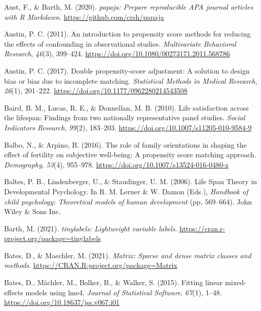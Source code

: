 \documentclass[
  english,
  man,floatsintext]{apa7}
\begin{document}
\leavevmode\hypertarget{ref-R-papaja}{}%
Aust, F., \& Barth, M. (2020). \emph{papaja: Prepare reproducible APA journal articles with R Markdown}. \url{https://github.com/crsh/papaja}

\leavevmode\hypertarget{ref-austinIntroductionPropensityScore2011}{}%
Austin, P. C. (2011). An introduction to propensity score methods for reducing the effects of confounding in observational studies. \emph{Multivariate Behavioral Research}, \emph{46}(3), 399--424. \url{https://doi.org/10.1080/00273171.2011.568786}

\leavevmode\hypertarget{ref-austinDoublePropensityscoreAdjustment2017}{}%
Austin, P. C. (2017). Double propensity-score adjustment: A solution to design bias or bias due to incomplete matching. \emph{Statistical Methods in Medical Research}, \emph{26}(1), 201--222. \url{https://doi.org/10.1177/0962280214543508}

\leavevmode\hypertarget{ref-bairdLifeSatisfactionLifespan2010}{}%
Baird, B. M., Lucas, R. E., \& Donnellan, M. B. (2010). Life satisfaction across the lifespan: Findings from two nationally representative panel studies. \emph{Social Indicators Research}, \emph{99}(2), 183--203. \url{https://doi.org/10.1007/s11205-010-9584-9}

\leavevmode\hypertarget{ref-balboRoleFamilyOrientations2016}{}%
Balbo, N., \& Arpino, B. (2016). The role of family orientations in shaping the effect of fertility on subjective well-being: A propensity score matching approach. \emph{Demography}, \emph{53}(4), 955--978. \url{https://doi.org/10.1007/s13524-016-0480-z}

\leavevmode\hypertarget{ref-baltesLifeSpanTheory2006}{}%
Baltes, P. B., Lindenberger, U., \& Staudinger, U. M. (2006). Life Span Theory in Developmental Psychology. In R. M. Lerner \& W. Damon (Eds.), \emph{Handbook of child psychology: Theoretical models of human development} (pp. 569--664). John Wiley \& Sons Inc.

\leavevmode\hypertarget{ref-R-tinylabels}{}%
Barth, M. (2021). \emph{tinylabels: Lightweight variable labels}. \url{https://cran.r-project.org/package=tinylabels}

\leavevmode\hypertarget{ref-R-Matrix}{}%
Bates, D., \& Maechler, M. (2021). \emph{Matrix: Sparse and dense matrix classes and methods}. \url{https://CRAN.R-project.org/package=Matrix}

\leavevmode\hypertarget{ref-R-lme4}{}%
Bates, D., Mächler, M., Bolker, B., \& Walker, S. (2015). Fitting linear mixed-effects models using lme4. \emph{Journal of Statistical Software}, \emph{67}(1), 1--48. \url{https://doi.org/10.18637/jss.v067.i01}
\end{document}
